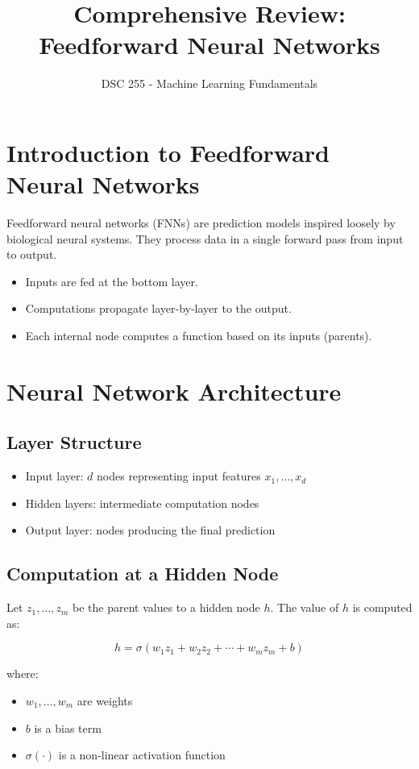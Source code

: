 \documentclass[11pt]{article}
\title{Comprehensive Review: Feedforward Neural Networks}
\author{DSC 255 - Machine Learning Fundamentals}
\date{}
\begin{document}
\maketitle
\tableofcontents
\newpage

\section{Introduction to Feedforward Neural Networks}

Feedforward neural networks (FNNs) are prediction models inspired loosely by biological neural systems. They process data in a single forward pass from input to output.

\begin{itemize}
    \item Inputs are fed at the bottom layer.
    \item Computations propagate layer-by-layer to the output.
    \item Each internal node computes a function based on its inputs (parents).
\end{itemize}

\section{Neural Network Architecture}

\subsection*{Layer Structure}
\begin{itemize}
    \item Input layer: $d$ nodes representing input features $x_1, \ldots, x_d$
    \item Hidden layers: intermediate computation nodes
    \item Output layer: nodes producing the final prediction
\end{itemize}

\subsection*{Computation at a Hidden Node}
Let $z_1, \ldots, z_m$ be the parent values to a hidden node $h$. The value of $h$ is computed as:

\[
h = \sigma(w_1 z_1 + w_2 z_2 + \cdots + w_m z_m + b)
\]

where:
\begin{itemize}
    \item $w_1, \ldots, w_m$ are weights
    \item $b$ is a bias term
    \item $\sigma(\cdot)$ is a non-linear activation function
\end{itemize}
\end{document}

